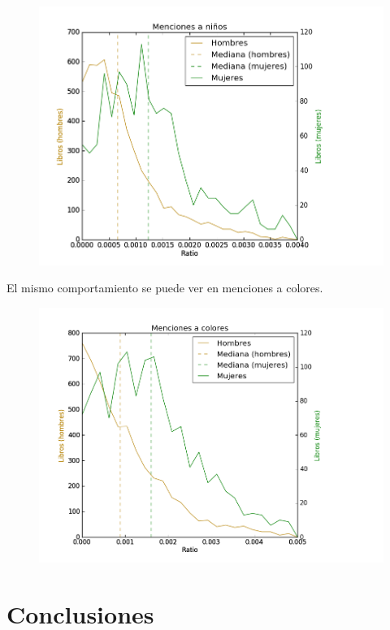 \documentclass[
journal=jacsat, %
manuscript=article]{achemso}
\begin{document}
\begin{figure}[H]
  \centering
  \includegraphics[width=1\textwidth]{graficos/curvas_children.png}
  \caption{}
\end{figure}

El mismo comportamiento se puede ver en menciones a colores.

\begin{figure}[H]
  \centering
  \includegraphics[width=1\textwidth]{graficos/curvas_colores.png}
  \caption{}
\end{figure}

\section{Conclusiones}
\end{document}
